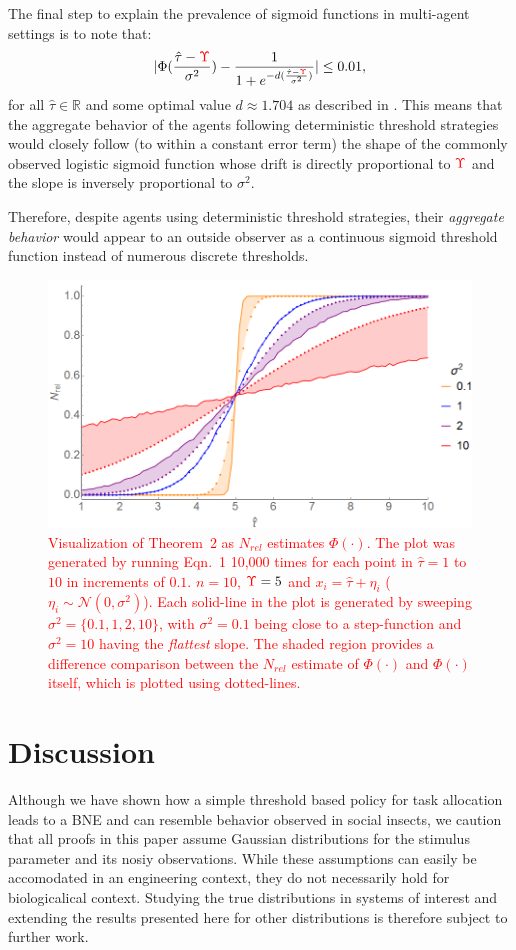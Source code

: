 \documentclass[smallextended]{svjour3}       %
\newcommand{\edit}[1]{\textcolor{red}{#1}}
\def\R{\mathbb{R}}    %
\def\td{\edit{\Upsilon}}   %
\begin{document}
The final step to explain the prevalence of sigmoid functions in multi-agent settings is to note that:
\begin{align*}
|\Phi(\frac{\hat{\tau}-\td}{\sigma^2})-\frac{1}{1+e^{-d(\frac{\hat{\tau}-\td}{\sigma^2})}}|\leq 0.01,
\end{align*}
for all $\hat{\tau}\in\R$ and some optimal value $d\approx 1.704$ as described in \citep{Camilli1994}. This means that the aggregate behavior of the agents following deterministic threshold strategies would closely follow (to within a constant error term) the shape of the commonly observed logistic sigmoid function whose drift is directly proportional to $\td$ and the slope is inversely proportional to $\sigma^2$. 

Therefore, despite agents using deterministic threshold strategies, their \emph{aggregate behavior} would appear to an outside observer as a continuous sigmoid threshold function instead of numerous discrete thresholds.
\begin{figure}[!ht]
	\centering\includegraphics[width=0.6\columnwidth]{figures/thm2fig.png}
	\centering\caption{\edit{Visualization of Theorem~2 as $N_{rel}$ estimates $\Phi(\cdot)$. The plot was generated by running Eqn.~1 10,000 times for each point in $\hat{\tau} = 1$ to $10$ in increments of $0.1$. $n = 10$, $\td = 5$ and $x_i = \hat{\tau} + \eta_i$ ($\eta_i \sim\mathcal{N}(0, \sigma^2)$). Each solid-line in the plot is generated by sweeping $\sigma^2 = \{0.1, 1, 2, 10\}$, with $\sigma^2 = 0.1$ being close to a step-function and $\sigma^2 = 10$ having the \emph{flattest} slope. The shaded region provides a difference comparison between the $N_{rel}$ estimate of $\Phi(\cdot)$ and $\Phi(\cdot)$ itself, which is plotted using dotted-lines.}}\label{fig:thm2fig}
\end{figure}

\section{Discussion}
Although we have shown how a simple threshold based policy for task allocation leads to a BNE and can resemble behavior observed in social insects, we caution that all proofs in this paper assume Gaussian distributions for the stimulus parameter and its nosiy observations. While these assumptions can easily be accomodated in an engineering context, they do not necessarily hold for biologicalical context. Studying the true distributions in systems of interest and extending the results presented here for other distributions is therefore subject to further work.
\end{document}
